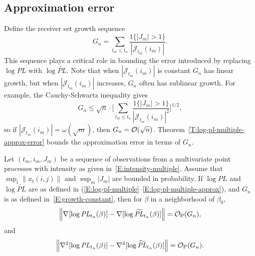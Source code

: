 \documentclass[final]{statsoc}
\begin{document}
\subsection{Approximation error}\label{S:approximation-error}
Define the receiver set growth sequence
\begin{equation}\label{E:growth-constant}
    G_n
        =
            \sum_{t_m \leq t_n}
                \frac{1\{|J_m| > 1\}}{|\mathcal{J}_{t_m}(i_m)|}.
\end{equation}
This sequence plays a critical role in bounding the error introduced by
replacing $\log \mathit{PL}$ with $\log \widetilde{\mathit{PL}}$.
Note that when $|\mathcal{J}_{t_m}(i_m)|$ is constant $G_n$ has linear
growth, but when $|\mathcal{J}_{t_m}(i_m)|$ increases, $G_n$ often has
sublinear growth.  For example, the Cauchy-Schwartz inequality gives
\[
    G_n
        \leq
            \sqrt{n}
            \cdot
            \bigg[
                \sum_{t_m \leq t_n}
                    \frac{1\{|J_m| > 1\}}{|\mathcal{J}_{t_m}(i_m)|^2}
            \bigg]^{1/2},
\]
so if $|\mathcal{J}_{t_m}(i_m)| = \omega(\sqrt{m})$, then
$G_n = \mathcal{O}(\sqrt{n})$.  Theorem~\ref{T:log-pl-multiple-approx-error} bounds
the approximation error in terms of $G_n$.

\begin{theorem}\label{T:log-pl-multiple-approx-error}
    Let $(t_m, i_m, J_m)$ be a sequence of observations from a multivariate
    point processes with intensity as given in~\eqref{E:intensity-multiple}.
    Assume that
    \(
        \sup_t \| x_t (i,j) \|
    \)
    and
    \(
        \sup_m | J_m |
    \)
    are bounded in probability.
    If $\log \mathit{PL}$ and $\log \widetilde{\mathit{PL}}$ are as
    defined in
    \textnormal{(}\ref{E:log-pl-multiple}--\ref{E:log-pl-multiple-approx}\textnormal{)},
    and $G_n$ is as defined in~\eqref{E:growth-constant},
    then for $\beta$ in a neighborhood of $\beta_0$,
    \[
        \Big\|
        \nabla [\log \mathit{PL}_{t_n}(\beta) ]
        -
        \nabla [\log \widetilde{\mathit{PL}}_{t_n}(\beta) ]
        \Big\|
            =
            \mathcal{O}_\text{P}(G_n),
    \]
    and
    \[
        \Big\|
        \nabla^2 [\log \mathit{PL}_{t_n}(\beta) ]
        -
        \nabla^2 [\log \widetilde{\mathit{PL}}_{t_n}(\beta) ]
        \Big\|
            =
            \mathcal{O}_\text{P}(G_n).
    \]
\end{theorem}
\end{document}
